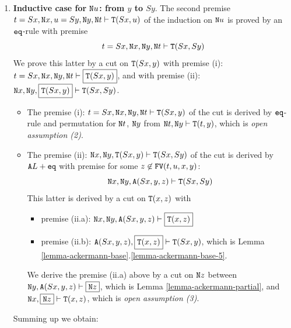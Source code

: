 \documentclass[a4paper,12pt]{article}
\newenvironment{proof}[1][Proof]{\begin{trivlist}
\item[\hskip \labelsep {\bfseries #1}]}{\end{trivlist}}
\newcommand{\Nat}               { {\tt N}  }
\newcommand{\FV}              { {\tt FV} }
\newcommand{\eq}              { {\tt eq} }
\newcommand{\Tot}           { {\tt T} }
\newcommand{\Ack}   {{\tt A}}
\newcommand{\Weak} { {\tt w} }
\begin{document}
\begin{proof}
\begin{enumerate}
\begin{enumerate}
\item
{\bf Inductive case for $\Nat u$: from $y$ to $Sy$}.
The second premise $t=Sx, \Nat x, u=Sy, \Nat y, \Nat t \vdash \Tot(Sx,u)$
of the induction on $\Nat u$
is proved by an $\eq$-rule with premise
$$t=Sx, \Nat x, \Nat y, \Nat t \vdash \Tot(Sx,Sy)$$
  We prove this latter by a cut on $\Tot(Sx,y)$ with premise (i):
$t=Sx, \Nat x, \Nat y, \Nat t \vdash \boxed{\Tot(Sx,y)}$, and with premise (ii):
$\Nat x, \Nat y,  \boxed{\Tot(Sx,y)} \vdash \Tot(Sx,Sy)$.
\begin{itemize}
\item
The premise (i): $t=Sx, \Nat x, \Nat y, \Nat t \vdash \Tot(Sx,y)$ of the cut 
is derived by $\eq$-rule and permutation for $\Nat t$, $\Nat y$ from 
$\Nat t, \Nat y \vdash \Tot(t,y)$, which is \emph{open assumption (2)}.
\item
The premise (ii): $\Nat x, \Nat y, \Tot(Sx,y) \vdash \Tot(Sx,Sy)$ of the cut 
is derived by $\Ack L+\eq$ with premise for some $z \not \in \FV(t,u,x,y)$:
$$ \Nat x, \Nat y, \Ack(Sx,y,z) \vdash \Tot(Sx,Sy)$$ 
This latter is derived by a cut on $\Tot(x,z)$ with 
\begin{itemize}
\item
premise (ii.a):
$ \Nat x, \Nat y, \Ack(Sx,y,z) \vdash \boxed{\Tot(x,z)}$
\item
premise (ii.b): $\Ack(Sx,y,z), \boxed{\Tot(x,z)} \vdash \Tot(Sx,y)$, which is 
Lemma \ref{lemma-ackermann-base}.\ref{lemma-ackermann-base-5}.
\end{itemize}
We derive the premise (ii.a) above
by a cut  on $\Nat z$ between $ \Nat y, \Ack(Sx,y,z) \vdash \boxed{\Nat z}$,
which is Lemma \ref{lemma-ackermann-partial},
and $\Nat x, \boxed{\Nat z} \vdash \Tot(x,z)$, which is 
\emph{open assumption (3)}.
\end{itemize}
Summing up we obtain:
\end{enumerate}

\newcommand{\firstPremiseCut}    
{{\infer[\eq\Weak]
           {t=Sx, {\blueStat{\Nat y}},{\redStat{\Nat t}}
              \vdash 
              \boxed{\color{darkgreen}\mathbf{\Tot(Sx,y)}}
            }
           {\deduce
                 {{\redStat{\Nat t}}, {\blueStat{\Nat y}} \vdash \Tot(t,y)}
                 {(open \ assumption \ 2)}
            }
}}


\end{enumerate}
\end{proof}
\end{document}
